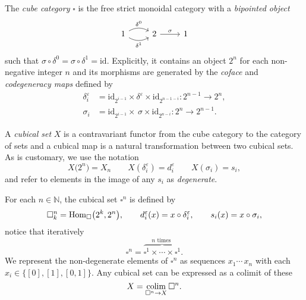 The \textit{cube category} $\square$ is the free strict monoidal category with a \textit{bipointed object}
\begin{equation*}
\begin{tikzcd}
1 \arrow[r, bend left, "\delta^0"] \arrow[r, bend right, "\delta^1"'] & 2 \arrow[r, "\sigma"] & 1
\end{tikzcd}
\end{equation*}
such that $\sigma \circ \delta^0 = \sigma \circ \delta^1 = \mathrm{id}$. Explicitly, it contains an object $2^n$ for each non-negative integer $n$ and its morphisms are generated by the \textit{coface} and \textit{codegeneracy maps} defined by
\begin{align*}
\delta_i^\varepsilon & = \mathrm{id}_{2^{i-1}} \times \delta^\varepsilon \times \mathrm{id}_{2^{n-1-i}} \colon 2^{n-1} \to 2^n, \\
\sigma_i & = \mathrm{id}_{2^{i-1}} \times \, \sigma \times \mathrm{id}_{2^{n-i}} \colon 2^{n} \to 2^{n-1}.
\end{align*}

A \textit{cubical set} $X$ is a contravariant functor from the cube category to the category of sets and a cubical map is a natural transformation between two cubical sets. As is customary, we use the notation
\begin{equation*}
X\big( 2^n \big) = X_n \qquad X(\delta^\varepsilon_i) = d^\varepsilon_i \qquad X(\sigma_i) = s_i,
\end{equation*}
and refer to elements in the image of any $s_i$ as \textit{degenerate}.

For each $n \in \mathbb{N}$, the cubical set $\square^n$ is defined by
\begin{equation*}
\square^n_k  = \mathrm{Hom}_{\square} \big( 2^k, 2^n \big), \qquad 
d^\varepsilon_i(x) = x \circ \delta^\varepsilon_i, \qquad 
s_i(x) = x \circ \sigma_i,
\end{equation*}
notice that iteratively
\begin{equation*}
\square^n = \overbrace{\square^1 \times \cdots \times \square^1}^{n \text{ times }}.
\end{equation*}
We represent the non-degenerate elements of $\square^n$ as sequences $x_1 \cdots\, x_n$ with each $x_i \in \{[0], [1], [0,1]\}$. Any cubical set can be expressed as a colimit of these
\begin{equation*}
X = \operatorname*{colim}_{\square^n \to X} \square^n.
\end{equation*}

